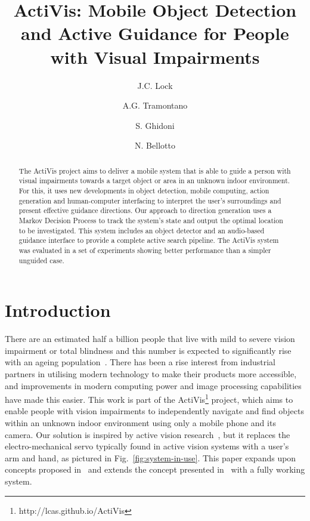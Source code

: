 \documentclass[runningheads]{llncs}
\begin{document}
\title{ActiVis: Mobile Object Detection and Active Guidance for People with Visual Impairments}

\author{J.C. Lock \and
  A.G. Tramontano \and
  S. Ghidoni \and
  N. Bellotto
}

\maketitle

\begin{abstract}
  The ActiVis project aims to deliver a mobile system that is able to guide a person with visual impairments towards a target object or area in an unknown indoor environment. 
  For this, it uses new developments in object detection, mobile computing, action generation and human-computer interfacing to interpret the user's surroundings and present effective guidance directions.
  Our approach to direction generation uses a Markov Decision Process to track the system's state and output the optimal location to be investigated.
  This system includes an object detector and an audio-based guidance interface to provide a complete active search pipeline.
  The ActiVis system was evaluated in a set of experiments showing better performance than a simpler unguided case.
\end{abstract}

\section{Introduction}

There are an estimated half a billion people that live with mild to severe vision impairment or total blindness and this number is expected to significantly rise with an ageing population~\cite{bourne2017magnitude}.
There has been a rise interest from industrial partners in utilising modern technology to make their products more accessible, and improvements in modern computing power and image processing capabilities have made this easier.
This work is part of the ActiVis\footnote{http://lcas.github.io/ActiVis} project, which aims to enable people with vision impairments to independently navigate and find objects within an unknown indoor environment using only a mobile phone and its camera.
Our solution is inspired by active vision research~\cite{bajcsy2017}, but it replaces the electro-mechanical servo typically found in active vision systems with a user's arm and hand, as pictured in Fig.~\ref{fig:system-in-use}.
This paper expands upon concepts proposed in~\cite{bellotto2013,lock2017portable} and extends the concept presented in~\cite{lock2019active} with a fully working system.
\end{document}
